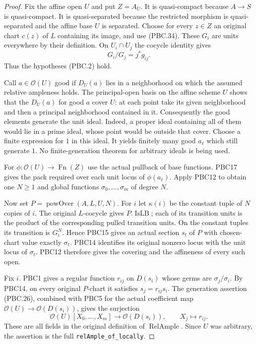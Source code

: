 \documentclass[11pt,a4paper]{article}
\numberwithin{equation}{section}
\theoremstyle{remark}\newtheorem{remark}[theorem]{Remark}
\begin{document}
\begin{proof}
Fix the affine open $U$ and put $Z=A_U$.
It is quasi-compact because $A\to S$ is quasi-compact.
It is quasi-separated because the restricted morphism is
quasi-separated and the affine base $U$ is separated.
Choose for every $z\in Z$ an original chart $c(z)$ of $L$
containing its image, and use (PBC.34).
These $G_i$ are units everywhere by their definition.
On $U_i\cap U_j$ the cocycle identity gives
\[
 G_i/G_j=j^*g_{ij}.
                                                        \tag{PBC.35}
\]
Thus the hypotheses (PBC.2) hold.

Call $a\in\mathcal O(U)$ good if $D_U(a)$ lies in a
neighborhood on which the assumed relative ampleness holds.
The principal-open basis on the affine scheme $U$ shows
that the $D_U(a)$ for good $a$ cover $U$:
at each point take its given neighborhood and then a
principal neighborhood contained in it.
Consequently the good elements generate the unit ideal.
Indeed, a proper ideal containing all of them would lie
in a prime ideal, whose point would be outside that cover.
Choose a finite expression for $1$ in this ideal.
It yields finitely many good $a_\ell$ which still generate $1$.
No finite-generation theorem for arbitrary ideals is being used.

For $\phi:\mathcal O(U)\to\operatorname{Fn}(Z)$ use the
actual pullback of base functions.  PBC17 gives the pack
required over each unit locus of $\phi(a_\ell)$.
Apply PBC12 to obtain one $N\ge1$ and global functions
$\sigma_0,\ldots,\sigma_m$ of degree $N$.

Now set $P=\operatorname{powOver}(A,L,U,N)$.
For $i$ let $\kappa(i)$ be the constant tuple of $N$
copies of $i$.  The original $L$-cocycle gives $P.\operatorname{IsLB}$;
each of its transition units is the product of the corresponding
pulled transition units.  On the constant tuples its transition
is $G_i^N$.  Hence PBC15 gives an actual section $s_t$ of
$P$ with chosen-chart value exactly $\sigma_t$.
PBC14 identifies its original nonzero locus with the unit
locus of $\sigma_t$.  PBC12 therefore gives the covering
and the affineness of every such open.

Fix $i$.  PBC1 gives a regular function
$r_{ij}$ on $D(s_i)$ whose germs are $\sigma_j/\sigma_i$.
By PBC14, on every original $P$-chart it satisfies
$s_j=r_{ij}s_i$.  The generation assertion (PBC.26),
combined with PBC5 for the actual coefficient map
$\mathcal O(U)\to\mathcal O(D(s_i))$, gives the surjection
\[
 \mathcal O(U)[X_0,\ldots,X_m]\longrightarrow
       \mathcal O(D(s_i)),\qquad X_j\longmapsto r_{ij}.
                                                        \tag{PBC.36}
\]
These are all fields in the original definition of
$\operatorname{RelAmple}$.  Since $U$ was arbitrary, the
assertion is the full \texttt{rel\allowbreak Ample\_\allowbreak of\_\allowbreak locally}.
\end{proof}
\end{document}
